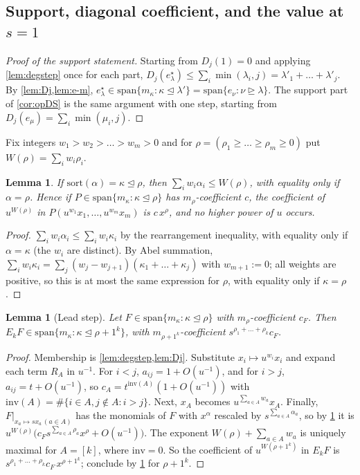 \documentclass[11pt]{amsart}
\newtheorem{lemma}[theorem]{Lemma}
\theoremstyle{definition}
\theoremstyle{remark}
\numberwithin{equation}{section}
\begin{document}
\subsection{Support, diagonal coefficient, and the value at $s=1$}
\begin{proof}[Proof of the support statement]
Starting from $D_j(1)=0$ and applying \cref{lem:degstep} once for each part, $D_j(e^\star_\lambda)\le\sum_i\min(\lambda_i,j)=\lambda'_1+\dots+\lambda'_j$. By \cref{lem:Dj,lem:e-m}, $e^\star_\lambda\in\mathrm{span}\{m_\kappa:\kappa\trianglelefteq\lambda'\}=\mathrm{span}\{e_\nu:\nu\trianglerighteq\lambda\}$. The support part of \cref{cor:opDS} is the same argument with one step, starting from $D_j(e_\mu)=\sum_i\min(\mu_i,j)$.
\end{proof}

Fix integers $w_1>w_2>\dots>w_m>0$ and for $\rho=(\rho_1\ge\dots\ge\rho_m\ge0)$ put $W(\rho)=\sum_iw_i\rho_i$.

\begin{lemma}\label{lem:weights}
If $\mathrm{sort}(\alpha)=\kappa\trianglelefteq\rho$, then $\sum_iw_i\alpha_i\le W(\rho)$, with equality only if $\alpha=\rho$. Hence if $P\in\mathrm{span}\{m_\kappa:\kappa\trianglelefteq\rho\}$ has $m_\rho$-coefficient $c$, the coefficient of $u^{W(\rho)}$ in $P(u^{w_1}x_1,\dots,u^{w_m}x_m)$ is $c\,x^\rho$, and no higher power of $u$ occurs.
\end{lemma}
\begin{proof}
$\sum_iw_i\alpha_i\le\sum_iw_i\kappa_i$ by the rearrangement inequality, with equality only if $\alpha=\kappa$ (the $w_i$ are distinct). By Abel summation, $\sum_iw_i\kappa_i=\sum_j(w_j-w_{j+1})(\kappa_1+\dots+\kappa_j)$ with $w_{m+1}:=0$; all weights are positive, so this is at most the same expression for $\rho$, with equality only if $\kappa=\rho$.
\end{proof}

\begin{lemma}[Lead step]\label{lem:leadstep}
Let $F\in\mathrm{span}\{m_\kappa:\kappa\trianglelefteq\rho\}$ with $m_\rho$-coefficient $c_F$. Then $E_kF\in\mathrm{span}\{m_\kappa:\kappa\trianglelefteq\rho+1^k\}$, with $m_{\rho+1^k}$-coefficient $s^{\rho_1+\dots+\rho_k}c_F$.
\end{lemma}
\begin{proof}
Membership is \cref{lem:degstep,lem:Dj}. Substitute $x_i\mapsto u^{w_i}x_i$ and expand each term $R_A$ in $u^{-1}$. For $i<j$, $a_{ij}=1+O(u^{-1})$, and for $i>j$, $a_{ij}=t+O(u^{-1})$, so $c_A=t^{\mathrm{inv}(A)}(1+O(u^{-1}))$ with $\mathrm{inv}(A)=\#\{i\in A,j\notin A:i>j\}$. Next, $x_A$ becomes $u^{\sum_{a\in A}w_a}x_A$. Finally, $F|_{x_a\mapsto sx_a\,(a\in A)}$ has the monomials of $F$ with $x^\alpha$ rescaled by $s^{\sum_{a\in A}\alpha_a}$, so by \cref{lem:weights} it is $u^{W(\rho)}\bigl(c_Fs^{\sum_{a\in A}\rho_a}x^\rho+O(u^{-1})\bigr)$. The exponent $W(\rho)+\sum_{a\in A}w_a$ is uniquely maximal for $A=[k]$, where $\mathrm{inv}=0$. So the coefficient of $u^{W(\rho+1^k)}$ in $E_kF$ is $s^{\rho_1+\dots+\rho_k}c_F\,x^{\rho+1^k}$; conclude by \cref{lem:weights} for $\rho+1^k$.
\end{proof}
\end{document}
